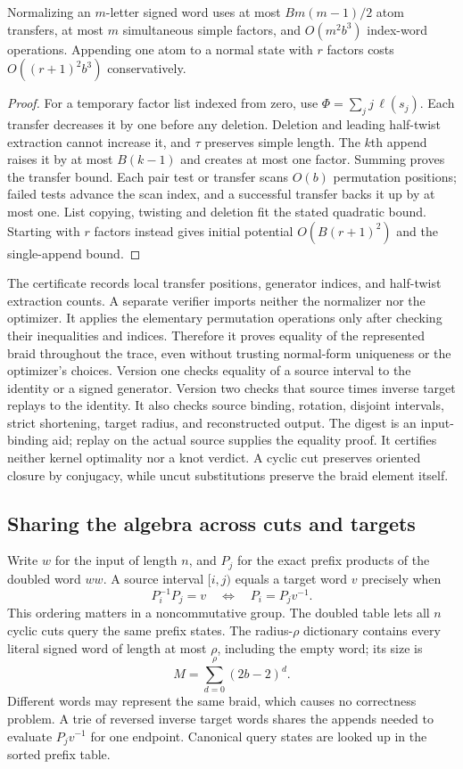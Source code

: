 \begin{proposition}
Normalizing an $m$-letter signed word uses at most $Bm(m-1)/2$ atom
transfers, at most $m$ simultaneous simple factors, and
$O(m^2b^3)$ index-word operations.  Appending one atom to a normal state
with $r$ factors costs $O((r+1)^2b^3)$ conservatively.
\end{proposition}
\begin{proof}
For a temporary factor list indexed from zero, use
$\Phi=\sum_j j\,\ell(s_j)$.  Each transfer decreases it by one before
any deletion.  Deletion and leading half-twist extraction cannot increase
it, and $\tau$ preserves simple length.  The $k$th append raises it by at
most $B(k-1)$ and creates at most one factor.  Summing proves the transfer
bound.  Each pair test or transfer scans $O(b)$ permutation positions;
failed tests advance the scan index, and a successful transfer backs it
up by at most one.  List copying, twisting and deletion fit the stated
quadratic bound.  Starting with $r$ factors instead gives initial
potential $O(B(r+1)^2)$ and the single-append bound.
\end{proof}

The certificate records local transfer positions, generator indices, and
half-twist extraction counts.  A separate verifier imports neither the
normalizer nor the optimizer.  It applies the elementary permutation
operations only after checking their inequalities and indices.  Therefore
it proves equality of the represented braid throughout the trace, even
without trusting normal-form uniqueness or the optimizer's choices.
Version one checks equality of a source interval to the identity or a
signed generator.  Version two checks that source times inverse target
replays to the identity.  It also checks source binding, rotation, disjoint
intervals, strict shortening, target radius, and reconstructed output.
The digest is an input-binding aid; replay on the actual source supplies
the equality proof.  It certifies neither kernel optimality nor a knot
verdict.  A cyclic cut preserves oriented closure by conjugacy, while
uncut substitutions preserve the braid element itself.

\subsection{Sharing the algebra across cuts and targets}

Write $w$ for the input of length $n$, and $P_j$ for the exact prefix
products of the doubled word $ww$.  A source interval $[i,j)$ equals a
target word $v$ precisely when
\[
 P_i^{-1}P_j=v\quad\Longleftrightarrow\quad P_i=P_jv^{-1}.
\]
This ordering matters in a noncommutative group.  The doubled table lets
all $n$ cyclic cuts query the same prefix states.  The radius-$\rho$
dictionary contains every literal signed word of length at most $\rho$,
including the empty word; its size is
\[
 M=\sum_{d=0}^{\rho}(2b-2)^d.
\]
Different words may represent the same braid, which causes no correctness
problem.  A trie of reversed inverse target words shares the appends
needed to evaluate $P_jv^{-1}$ for one endpoint.  Canonical query states
are looked up in the sorted prefix table.


